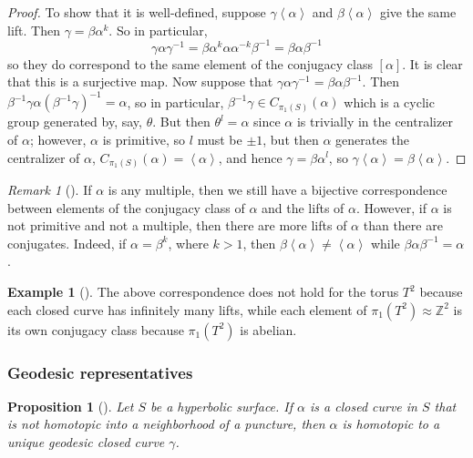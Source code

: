 \documentclass[reqno]{amsart}
\newtheorem{proposition}[theorem]{Proposition}
\theoremstyle{definition}
\newtheorem{example}[theorem]{Example}
\theoremstyle{remark}
\newtheorem*{remark}{Remark}
\begin{document}
 \begin{proof}
To show that it is well-defined, suppose $\gamma \left<\alpha \right>$ and
$\beta \left<\alpha \right>$ give the same lift. Then
$\gamma = \beta \alpha^k$. So in particular,
\[
    \gamma \alpha \gamma^{-1} = \beta \alpha^k \alpha \alpha^{-k} \beta^{-1}
    = \beta \alpha \beta^{-1}
\] 
so they do correspond to the same element of the conjugacy class
$\left[ \alpha \right] $. It is clear that this is a surjective map.
Now suppose that $\gamma \alpha \gamma^{-1} = \beta \alpha \beta^{-1}$. 
Then $\beta^{-1} \gamma \alpha \left( \beta^{-1} \gamma \right)^{-1} =
\alpha$, so in particular, $\beta^{-1} \gamma \in C_{\pi_1(S)}(\alpha)$
which is a cyclic group generated by, say, $\theta$. But then
$\theta^l = \alpha$ since $\alpha$ is trivially in the centralizer of
$\alpha$; however, $\alpha$ is primitive, so
$l$ must be $\pm 1$, but then  $\alpha$ generates the centralizer of
$\alpha$, $C_{\pi_1 (S)}(\alpha) = \left<\alpha \right>$, and hence
$\gamma = \beta \alpha^l$, so $\gamma \left<\alpha \right>
= \beta \left<\alpha \right>$.
 \end{proof}

 \begin{remark}[]
     If $\alpha$ is any multiple, then we still have a bijective correspondence
     between elements of the conjugacy class of $\alpha$ and the
     lifts of $\alpha$. However, if $\alpha$ is not primitive and not
     a multiple, then there are more lifts of $\alpha$ than there
     are conjugates. Indeed, if $\alpha = \beta^{k}$, where $k > 1$, then
     $\beta \left<\alpha \right> \neq \left<\alpha \right>$ while
     $\beta \alpha \beta^{-1} = \alpha$.
 \end{remark}

 \begin{example}[]
     The above correspondence does not hold for the torus $T^2$ because
     each closed curve has infinitely many lifts, while
     each element of $\pi_1 \left( T^2 \right) \approx \mathbb{Z}^2$ 
     is its own conjugacy class because $\pi_1 \left( T^2 \right) $ is
     abelian. 
 \end{example}

 \subsubsection*{Geodesic representatives}
 \begin{proposition}[]\label{unique-geodesic-representative}
     Let $S$ be a hyperbolic surface. If $\alpha$ is a closed curve
     in $S$ that is not homotopic into a neighborhood of a puncture, then
     $\alpha$ is homotopic to a unique geodesic closed curve $\gamma$.
 \end{proposition}
 
\end{document}
